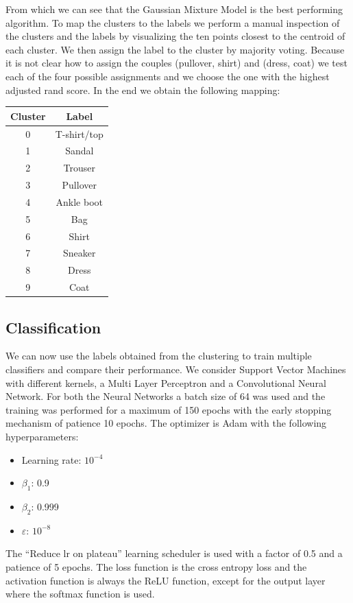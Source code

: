 From which we can see that the Gaussian Mixture Model is the best 
performing algorithm.
To map the clusters to the labels we perform a manual inspection of the
clusters and the labels by visualizing the ten points closest to the
centroid of each cluster. We then assign the label to the cluster by
majority voting. 
Because it is not clear how to assign the couples (pullover, shirt) and (dress, coat)
we test each of the four possible assignments and we choose the one with 
the highest adjusted rand score.
In the end we obtain the following mapping:
\begin{table}[H]
    \centering
    \begin{tabular}{|c|c|}
        \hline
        Cluster & Label \\
        \hline
        0       & T-shirt/top \\
        1       & Sandal \\
        2       & Trouser \\
        3       & Pullover \\
        4       & Ankle boot \\
        5       & Bag \\
        6       & Shirt \\
        7       & Sneaker \\
        8       & Dress \\
        9       & Coat \\
        \hline
    \end{tabular}
\end{table}

\subsection{Classification}
We can now use the labels obtained from the clustering to train multiple
classifiers and compare their performance.
We consider Support Vector Machines with different kernels, a Multi Layer
Perceptron and a Convolutional Neural Network.
For both the Neural Networks a batch size of 64 was used and the training
was performed for a maximum of 150 epochs with the early stopping mechanism
of patience 10 epochs.
The optimizer is Adam with the following hyperparameters:
\begin{itemize}
    \item Learning rate: $10^{-4}$
    \item $\beta_1$: 0.9
    \item $\beta_2$: 0.999
    \item $\varepsilon$: $10^{-8}$
\end{itemize}
The \enquote{Reduce lr on plateau} learning scheduler is used with a factor
of 0.5 and a patience of 5 epochs.
The loss function is the cross entropy loss and the activation function
is always the ReLU function, except for the output layer where the softmax
function is used.

